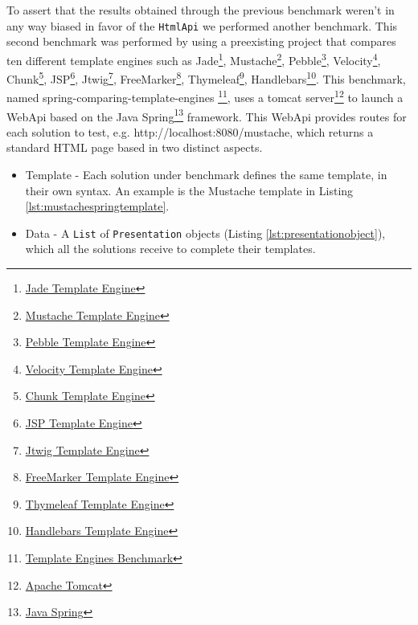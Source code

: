 To assert that the results obtained through the previous benchmark weren't in any way biased in favor of the \texttt{HtmlApi} we performed another benchmark. This second benchmark was performed by using a preexisting project that compares ten different template engines such as Jade\footnote{\href{http://jade-lang.com/}{Jade Template Engine}}, Mustache\footnote{\href{https://mustache.github.io/}{Mustache Template Engine}}, Pebble\footnote{\href{http://www.mitchellbosecke.com/pebble/home}{Pebble Template Engine}}, Velocity\footnote{\href{http://velocity.apache.org/}{Velocity Template Engine}}, Chunk\footnote{\href{http://www.x5software.com/chunk/examples/ChunkExample}{Chunk Template Engine}}, JSP\footnote{\href{http://www.oracle.com/technetwork/java/index-jsp-138231.html}{JSP Template Engine}}, Jtwig\footnote{\href{http://jtwig.org/}{Jtwig Template Engine}}, FreeMarker\footnote{\href{https://freemarker.apache.org/}{FreeMarker Template Engine}}, Thymeleaf\footnote{\href{https://www.thymeleaf.org/}{Thymeleaf Template Engine}}, Handlebars\footnote{\href{https://handlebarsjs.com/}{Handlebars Template Engine}}. This benchmark, named spring-comparing-template-engines \footnote{\href{https://github.com/jreijn/spring-comparing-template-engines}{Template Engines Benchmark}}, uses a tomcat server\footnote{\href{http://tomcat.apache.org/}{Apache Tomcat}} to launch a WebApi based on the Java Spring\footnote{\href{https://spring.io/}{Java Spring}} framework. This WebApi provides routes for each solution to test, e.g. http://localhost:8080/mustache, which returns a standard \ac{HTML} page based in two distinct aspects. 

\begin{itemize}
	\item Template - Each solution under benchmark defines the same template, in their own syntax. An example is the Mustache template in Listing \ref{lst:mustachespringtemplate}.
	\item Data - A \texttt{List} of \texttt{Presentation} objects (Listing \ref{lst:presentationobject}), which all the solutions receive to complete their templates.
\end{itemize}


